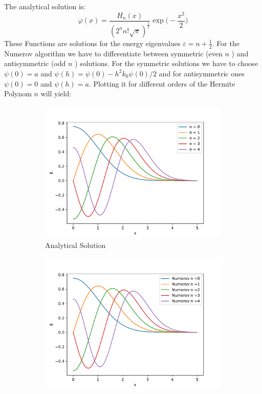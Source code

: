 \documentclass{article}
\begin{document}
The analytical solution is:
\[ 
    \varphi (x) = \frac{H_n (x)}{(2 ^{n} n ! \sqrt{\pi} ) ^{\frac{1}{2}}} 
    \exp \bigg(-\frac{x^2}{2} \bigg )
\]
These Functions are solutions for the energy eigenvalues \( \varepsilon = n +
    \frac{1}{2}\). For the Numerov algorithm we have to differentiate between
symmetric (even \( n \) ) and antisymmetric (odd \( n \) ) solutions. For 
the symmetric solutions we have to choose \( \psi (0) = a \) and \( \psi (h) 
    = \psi (0) - h^2k_0 \psi (0)/2 \) and for antisymmetric ones \( \psi (0)
    = 0\) and \( \psi (h) = a \).
Plotting it for different orders of the Hermite Polynom \( n \) will yield:
\begin{figure}[H]
    \centering
    \begin{subfigure}{.49\textwidth}
    \includegraphics[width=\textwidth]{analytical.pdf} 
    \caption{Analytical Solution}  
    \end{subfigure}
    \begin{subfigure}{.49\textwidth}
    \includegraphics[width=\textwidth]{Numerov.pdf} 

\end{subfigure}
\end{figure}
\end{document}

